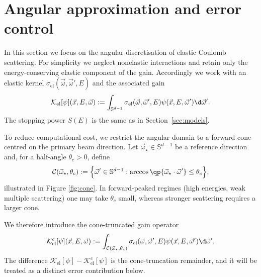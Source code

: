 \documentclass[final]{amsart}
\begin{document}
\section{Angular approximation and error control}
\label{sec:angular}

In this section we focus on the angular discretisation of elastic
Coulomb scattering. For simplicity we neglect nonelastic interactions
and retain only the energy-conserving elastic component of the gain.
Accordingly we work with an elastic kernel
$\sigma_{\text{el}}(\vec{\omega},\vec{\omega}',E)$ and the associated
gain
\[
  \mathcal{K}_{\text{el}}[\psi](\vec{x},E,\vec{\omega})
  :=
  \int_{\mathbb{S}^{d-1}}
  \sigma_{\text{el}}(\vec{\omega},\vec{\omega}',E) 
  \psi(\vec{x},E,\vec{\omega}') \d\vec{\omega}'.
\]
The stopping power $S(E)$ is the same as in Section~\ref{sec:models}.

To reduce computational cost, we restrict the angular domain to a
forward cone centred on the primary beam direction. Let
$\vec{\omega}_\star\in\mathbb{S}^{d-1}$ be a reference direction and,
for a half-angle $\theta_c>0$, define
\begin{equation}
  \label{eq:cone}
  \mathcal{C}(\vec{\omega}_\star,\theta_c)
  :=
  \Big\{ \vec{\omega}'\in\mathbb{S}^{d-1} :
  \arccos\qp{\vec{\omega}_\star \cdot \vec{\omega}'}\le \theta_c \Big\},
\end{equation}
illustrated in Figure \ref{fig:cone}. In forward-peaked regimes (high
energies, weak multiple scattering) one may take $\theta_c$ small,
whereas stronger scattering requires a larger cone.

We therefore introduce the cone-truncated gain operator
\[
  \mathcal{K}_{\text{el}}^{c}[\psi](\vec{x},E,\vec{\omega})
  :=
  \int_{\mathcal{C}(\vec{\omega}_\star,\theta_c)}
  \sigma_{\text{el}}(\vec{\omega},\vec{\omega}',E) 
  \psi(\vec{x},E,\vec{\omega}') \d\vec{\omega}'.
\]
The difference $\mathcal{K}_{\text{el}}[\psi]-\mathcal{K}_{\text{el}}^{c}[\psi]$
is the cone-truncation remainder, and it will be treated as a distinct
error contribution below.
\end{document}
